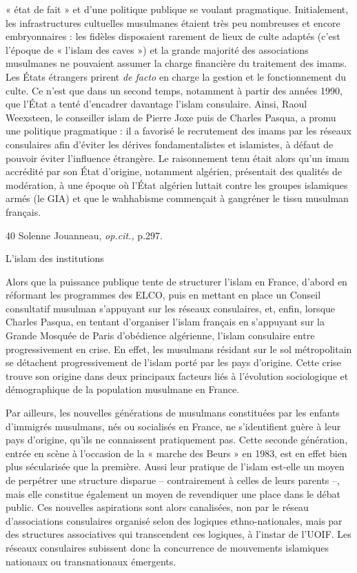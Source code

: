 « état de fait » et d'une politique publique se voulant pragmatique.
Initialement, les infrastructures cultuelles musulmanes étaient très peu
nombreuses et encore embryonnaires : les fidèles disposaient rarement de
lieux de culte adaptés (c'est l'époque de « l'islam des caves ») et la
grande majorité des associations musulmanes ne pouvaient assumer la
charge financière du traitement des imams. Les États étrangers prirent
\emph{de facto} en charge la gestion et le fonctionnement du culte. Ce
n'est que dans un second temps, notamment à partir des années 1990, que
l'État a tenté d'encadrer davantage l'islam consulaire. Ainsi, Raoul
Weexsteen, le conseiller islam de Pierre Joxe puis de Charles Pasqua, a
promu une politique pragmatique : il a favorisé le recrutement des imams
par les réseaux consulaires afin d'éviter les dérives fondamentalistes
et islamistes, à défaut de pouvoir éviter l'influence étrangère. Le
raisonnement tenu était alors qu'un imam accrédité par son État
d'origine, notamment algérien, présentait des qualités de modération, à
une époque où l'État algérien luttait contre les groupes islamiques
armés (le GIA) et que le wahhabisme commençait à gangréner le tissu
musulman français.

40 Solenne Jouanneau, \emph{op.cit.,} p.297.




L'islam des institutions


Alors que la puissance publique tente de structurer l'islam en France,
d'abord en réformant les programmes des ELCO, puis en mettant en place
un Conseil consultatif musulman s'appuyant sur les réseaux consulaires,
et, enfin, lorsque Charles Pasqua, en tentant d'organiser l'islam
français en s'appuyant sur la Grande Mosquée de Paris d'obédience
algérienne, l'islam consulaire entre progressivement en crise. En effet,
les musulmans résidant sur le sol métropolitain se détachent
progressivement de l'islam porté par les pays d'origine. Cette crise
trouve son origine dans deux principaux facteurs liés à l'évolution
sociologique et démographique de la population musulmane en France.

Par ailleurs, les nouvelles générations de musulmans constituées par les
enfants d'immigrés musulmans, nés ou socialisés en France, ne
s'identifient guère à leur pays d'origine, qu'ils ne connaissent
pratiquement pas. Cette seconde génération, entrée en scène à l'occasion
de la « marche des Beurs » en 1983, est en effet bien plus sécularisée
que la première. Aussi leur pratique de l'islam est-elle un moyen de
perpétrer une structure disparue -- contrairement à celles de leurs
parents --, mais elle constitue également un moyen de revendiquer une
place dans le débat public. Ces nouvelles aspirations sont alors
canalisées, non par le réseau d'associations consulaires organisé selon
des logiques ethno-nationales, mais par des structures associatives qui
transcendent ces logiques, à l'instar de l'UOIF. Les réseaux consulaires
subissent donc la concurrence de mouvements islamiques nationaux ou
transnationaux émergents.

